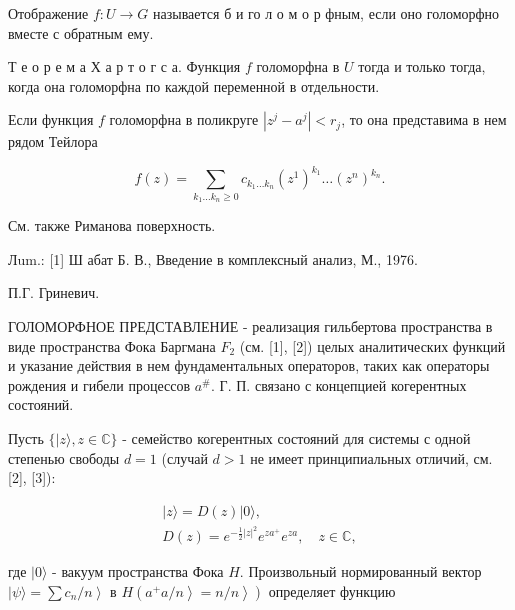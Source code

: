 \documentclass[10pt]{article}
\begin{document}
Отображение $f: U \rightarrow G$ называется б и го л о м о р фным, если оно голоморфно вместе с обратным ему.



Т е о р е м а Х а р т о г с а. Функция $f$ голоморфна в $U$ тогда и только тогда, когда она голоморфна по каждой переменной в отдельности.



Если функция $f$ голоморфна в поликруге $\left|z^{j}-a^{j}\right|<r_{j}$, то она представима в нем рядом Тейлора



\[

f(z)=\sum_{k_{1} \ldots k_{n} \geqslant 0} c_{k_{1} \ldots k_{n}}\left(z^{1}\right)^{k_{1}} \ldots\left(z^{n}\right)^{k_{n}} .

\]



См. также Риманова поверхность.



Лum.: [1] Ш абат Б. В., Введение в комплексный анализ, М., 1976.



П.Г. Гриневич.



ГОЛОМОРФНОЕ ПРЕДСТАВЛЕНИЕ - реализация гильбертова пространства в виде пространства Фока Баргмана $F_{2}$ (см. [1], [2]) целых аналитических функций и указание действия в нем фундаментальных операторов, таких как операторы рождения и гибели процессов $a^{\#}$. Г. П. связано с концепцией когерентных состояний.



Пусть $\{|z\rangle, z \in \mathbb{C}\}$ - семейство когерентных состояний для системы с одной степенью свободы $d=1$ (случай $d>1$ не имеет принципиальных отличий, см. [2], [3]):



\[

\begin{gathered}

|z\rangle=D(z)|0\rangle, \\

D(z)=e^{-\frac{1}{2}|z|^{2}} e^{z a^{+}} e^{z a}, \quad z \in \mathbb{C},

\end{gathered}

\]



где $|0\rangle$ - вакуум пространства Фока $H$. Произвольный нормированный вектор $\left.|\psi\rangle=\sum c_{n} / n\right\rangle$ в $\left.\left.H\left(a^{+} a / n\right\rangle=n / n\right\rangle\right)$ определяет функцию
\end{document}
